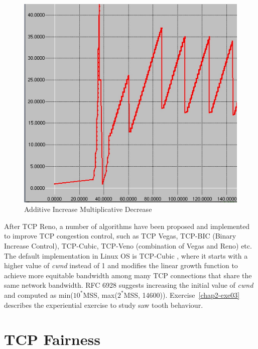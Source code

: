 \begin{multicols}{2}
\begin{figure}[H]
\includegraphics[scale=.93]{src/Figures/chap2/chap2-fig05.jpg}
\caption{Additive Increase Multiplicative Decrease}\label{chap2-fig05}
\end{figure}

After TCP Reno, a number of algorithms have been proposed and implemented to improve TCP congestion control, such as TCP Vegas,  TCP-BIC (Binary Increase Control), TCP-Cubic, TCP-Veno (combination of Vegas and Reno) etc. The default implementation in Linux OS is TCP-Cubic \cite{art2-key08}, where it starts with a higher value of \textit{cwnd} instead of 1 and modifies the linear growth function to achieve more equitable bandwidth among many TCP connections that share the same network bandwidth. RFC 6928 \cite{art2-key07} suggests increasing the initial value of \textit{cwnd} and computed as min($10^{\ast}$MSS, max($2^{\ast}$MSS, 14600)). Exercise~\ref{chap2-exe03} describes the experiential exercise to study saw tooth behaviour.

\section{TCP Fairness}


\end{multicols}
